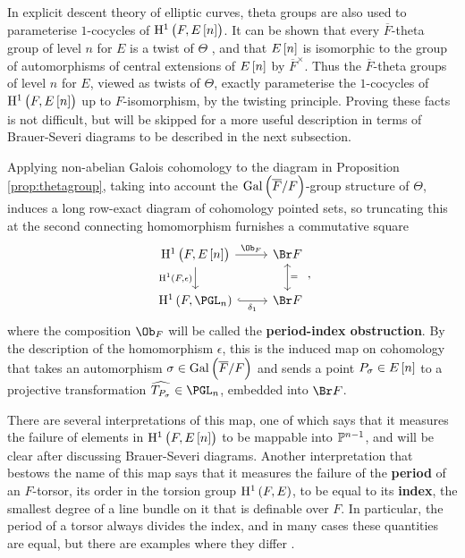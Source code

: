 \begin{remark}
In explicit descent theory of elliptic curves, theta groups are also used to parameterise $ 1 $-cocycles of $ \HE[n]{F} $. It can be shown that every $ \overline{F} $-theta group of level $ n $ for $ E $ is a twist of $ \Theta $ \cite[Proposition 1.6]{Sto10}, and that $ E\sbr{n} $ is isomorphic to the group of automorphisms of central extensions of $ E\sbr{n} $ by $ \overline{F}^\times $. Thus the $ \overline{F} $-theta groups of level $ n $ for $ E $, viewed as twists of $ \Theta $, exactly parameterise the $ 1 $-cocycles of $ \HE[n]{F} $ up to $ F $-isomorphism, by the twisting principle. Proving these facts is not difficult, but will be skipped for a more useful description in terms of Brauer-Severi diagrams to be described in the next subsection.
\end{remark}

Applying non-abelian Galois cohomology to the diagram in Proposition \ref{prop:thetagroup}, taking into account the $ \AG{F} $-group structure of $ \Theta $, induces a long row-exact diagram of cohomology pointed sets, so truncating this at the second connecting homomorphism furnishes a commutative square
$$
\begin{tikzcd}
\HE[n]{F} \arrow{r}{\Ob_F} \arrow{d}[swap]{\H^1\br{F, \epsilon}} & \Br F \arrow[leftrightarrow]{d}{=} \\
\H^1\br{F, \PGL_n} \arrow[hookrightarrow]{r}[swap]{\delta_1} & \Br F
\end{tikzcd},
$$
where the composition $ \Ob_F $ will be called the \textbf{period-index obstruction}. By the description of the homomorphism $ \epsilon $, this is the induced map on cohomology that takes an automorphism $ \sigma \in \AG{F} $ and sends a point $ P_\sigma \in E\sbr{n} $ to a projective transformation $ \widehat{T_{P_\sigma}} \in \PGL_n $, embedded into $ \Br F $.

\begin{remark}
There are several interpretations of this map, one of which says that it measures the failure of elements in $ \HE[n]{F} $ to be mappable into $ \mathbb{P}^{n - 1} $, and will be clear after discussing Brauer-Severi diagrams. Another interpretation that bestows the name of this map says that it measures the failure of the \textbf{period} of an $ F $-torsor, its order in the torsion group $ \HE{F} $, to be equal to its \textbf{index}, the smallest degree of a line bundle on it that is definable over $ F $. In particular, the period of a torsor always divides the index, and in many cases these quantities are equal, but there are examples where they differ \cite[Section 1]{ONe01}.
\end{remark}

